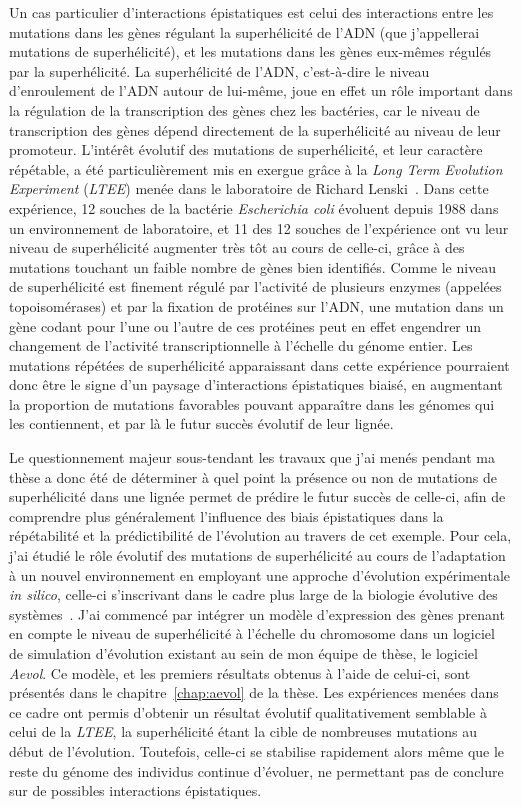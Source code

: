 Un cas particulier d'interactions épistatiques est celui des interactions entre les mutations dans les gènes régulant la superhélicité de l'ADN (que j'appellerai mutations de superhélicité), et les mutations dans les gènes eux-mêmes régulés par la superhélicité.
La superhélicité de l'ADN, c'est-à-dire le niveau d'enroulement de l'ADN autour de lui-même, joue en effet un rôle important dans la régulation de la transcription des gènes chez les bactéries, car le niveau de transcription des gènes dépend directement de la superhélicité au niveau de leur promoteur.
L'intérêt évolutif des mutations de superhélicité, et leur caractère répétable, a été particulièrement mis en exergue grâce à la \emph{Long Term Evolution Experiment} (\emph{LTEE}) menée dans le laboratoire de Richard Lenski~\citep{lenski1991}.
Dans cette expérience, 12 souches de la bactérie \emph{Escherichia coli} évoluent depuis 1988 dans un environnement de laboratoire, et 11 des 12 souches de l'expérience ont vu leur niveau de superhélicité augmenter très tôt au cours de celle-ci, grâce à des mutations touchant un faible nombre de gènes bien identifiés.
Comme le niveau de superhélicité est finement régulé par l'activité de plusieurs enzymes (appelées topoisomérases) et par la fixation de protéines sur l'ADN, une mutation dans un gène codant pour l'une ou l'autre de ces protéines peut en effet engendrer un changement de l'activité transcriptionnelle à l'échelle du génome entier.
Les mutations répétées de superhélicité apparaissant dans cette expérience pourraient donc être le signe d'un paysage d'interactions épistatiques biaisé, en augmentant la proportion de mutations favorables pouvant apparaître dans les génomes qui les contiennent, et par là le futur succès évolutif de leur lignée.

Le questionnement majeur sous-tendant les travaux que j'ai menés pendant ma thèse a donc été de déterminer à quel point la présence ou non de mutations de superhélicité dans une lignée permet de prédire le futur succès de celle-ci, afin de comprendre plus généralement l'influence des biais épistatiques dans la répétabilité et la prédictibilité de l'évolution au travers de cet exemple.
Pour cela, j'ai étudié le rôle évolutif des mutations de superhélicité au cours de l'adaptation à un nouvel environnement en employant une approche d'évolution expérimentale \emph{in silico}, celle-ci s'inscrivant dans le cadre plus large de la biologie évolutive des systèmes~\citep{beslon2021}.
J'ai commencé par intégrer un modèle d'expression des gènes prenant en compte le niveau de superhélicité à l'échelle du chromosome dans un logiciel de simulation d'évolution existant au sein de mon équipe de thèse, le logiciel \emph{Aevol}.
Ce modèle, et les premiers résultats obtenus à l'aide de celui-ci, sont présentés dans le chapitre~\ref{chap:aevol} de la thèse.
Les expériences menées dans ce cadre ont permis d'obtenir un résultat évolutif qualitativement semblable à celui de la \emph{LTEE}, la superhélicité étant la cible de nombreuses mutations au début de l'évolution.
Toutefois, celle-ci se stabilise rapidement alors même que le reste du génome des individus continue d'évoluer, ne permettant pas de conclure sur de possibles interactions épistatiques.

